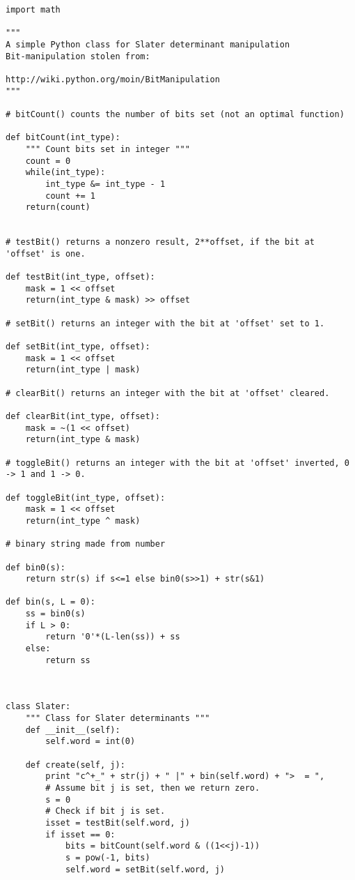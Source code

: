 \documentclass[%
oneside,                 %
final,                   %
10pt]{article}
\begin{document}
\begin{verbatim}
import math

"""
A simple Python class for Slater determinant manipulation
Bit-manipulation stolen from:

http://wiki.python.org/moin/BitManipulation
"""

# bitCount() counts the number of bits set (not an optimal function)

def bitCount(int_type):
    """ Count bits set in integer """
    count = 0
    while(int_type):
        int_type &= int_type - 1
        count += 1
    return(count)


# testBit() returns a nonzero result, 2**offset, if the bit at 'offset' is one.

def testBit(int_type, offset):
    mask = 1 << offset
    return(int_type & mask) >> offset

# setBit() returns an integer with the bit at 'offset' set to 1.

def setBit(int_type, offset):
    mask = 1 << offset
    return(int_type | mask)

# clearBit() returns an integer with the bit at 'offset' cleared.

def clearBit(int_type, offset):
    mask = ~(1 << offset)
    return(int_type & mask)

# toggleBit() returns an integer with the bit at 'offset' inverted, 0 -> 1 and 1 -> 0.

def toggleBit(int_type, offset):
    mask = 1 << offset
    return(int_type ^ mask)

# binary string made from number

def bin0(s):
    return str(s) if s<=1 else bin0(s>>1) + str(s&1)

def bin(s, L = 0):
    ss = bin0(s)
    if L > 0:
        return '0'*(L-len(ss)) + ss
    else:
        return ss
    
    

class Slater:
    """ Class for Slater determinants """
    def __init__(self):
        self.word = int(0)

    def create(self, j):
        print "c^+_" + str(j) + " |" + bin(self.word) + ">  = ",
        # Assume bit j is set, then we return zero.
        s = 0
        # Check if bit j is set.
        isset = testBit(self.word, j)
        if isset == 0:
            bits = bitCount(self.word & ((1<<j)-1))
            s = pow(-1, bits)
            self.word = setBit(self.word, j)


\end{verbatim}
\end{document}
